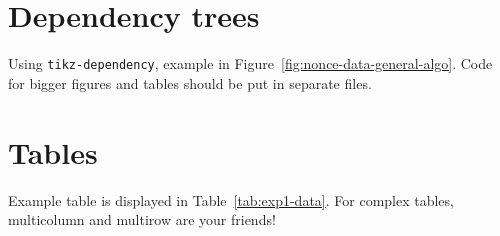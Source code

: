 \section{Dependency trees}

Using \texttt{tikz-dependency}, example in Figure~\ref{fig:nonce-data-general-algo}. Code for bigger figures and tables should be put in separate files. 



\section{Tables}

Example table is displayed in Table~\ref{tab:exp1-data}. 
For complex tables, multicolumn and multirow are your friends!






